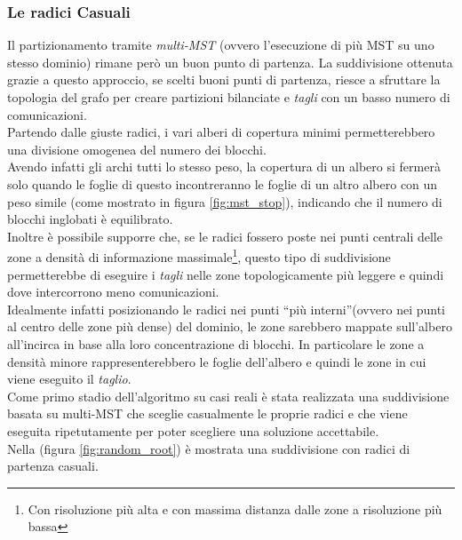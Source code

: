 \subsubsection{Le radici Casuali}\label{subsubsec:random_roots}
Il partizionamento tramite \emph{multi-MST} (ovvero l'esecuzione di più MST su uno stesso dominio) rimane però un buon punto di partenza. La suddivisione ottenuta grazie a questo approccio, se scelti buoni punti di partenza, riesce a sfruttare la topologia del grafo per creare partizioni bilanciate e \textit{tagli} con un basso numero di comunicazioni.\\
Partendo dalle giuste radici, i vari alberi di copertura minimi permetterebbero una divisione omogenea del numero dei blocchi.\\
Avendo infatti gli archi tutti lo stesso peso, la copertura di un albero si fermerà solo quando le foglie di questo incontreranno le foglie di un altro albero con un peso simile (come mostrato in figura \ref{fig:mst_stop}), indicando che il numero di blocchi inglobati è equilibrato.\\
Inoltre è possibile supporre che, se le radici fossero poste nei punti centrali delle zone a densità di informazione massimale\footnote{Con risoluzione più alta e con massima distanza dalle zone a risoluzione più bassa}, questo tipo di suddivisione permetterebbe di eseguire i \textit{tagli} nelle zone topologicamente più leggere e quindi dove intercorrono meno comunicazioni.\\
Idealmente infatti posizionando le radici nei punti \textquotedblleft più interni\textquotedblright (ovvero nei punti al centro delle zone più dense) del dominio, le zone sarebbero mappate sull'albero all'incirca in base alla loro concentrazione di blocchi. In particolare le zone a densità minore rappresenterebbero le foglie dell'albero e quindi le zone in cui viene eseguito il \textit{taglio}.\\
Come primo stadio dell'algoritmo su casi reali è stata realizzata una suddivisione basata su multi-MST che sceglie casualmente le proprie radici e che viene eseguita ripetutamente per poter scegliere una soluzione accettabile.\\
Nella (figura \ref{fig:random_root}) è mostrata una suddivisione con radici di partenza casuali.
